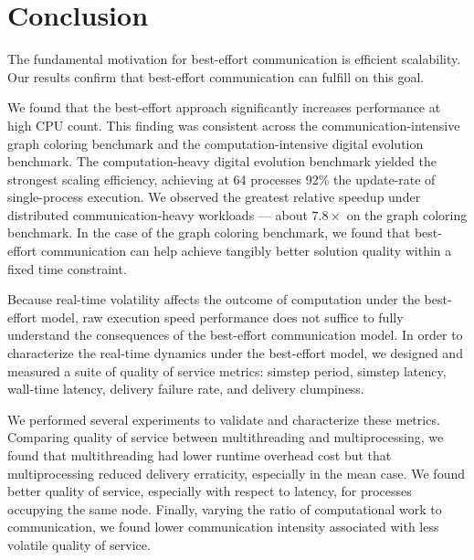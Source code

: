 \section{Conclusion}

The fundamental motivation for best-effort communication is efficient scalability.
Our results confirm that best-effort communication can fulfill on this goal.

We found that the best-effort approach significantly increases performance at high CPU count.
This finding was consistent across the communication-intensive graph coloring benchmark and the computation-intensive digital evolution benchmark.
The computation-heavy digital evolution benchmark yielded the strongest scaling efficiency, achieving at 64 processes 92\% the update-rate of single-process execution.
We observed the greatest relative speedup under distributed communication-heavy workloads --- about $7.8\times$ on the graph coloring benchmark.
In the case of the graph coloring benchmark, we found that best-effort communication can help achieve tangibly better solution quality within a fixed time constraint.

Because real-time volatility affects the outcome of computation under the best-effort model, raw execution speed performance does not suffice to fully understand the consequences of the best-effort communication model.
In order to characterize the real-time dynamics under the best-effort model, we designed and measured a suite of quality of service metrics: simstep period, simstep latency, wall-time latency, delivery failure rate, and delivery clumpiness.

We performed several experiments to validate and characterize these metrics.
Comparing quality of service between multithreading and multiprocessing, we found that multithreading had lower runtime overhead cost but that multiprocessing reduced delivery erraticity, especially in the mean case.
We found better quality of service, especially with respect to latency, for processes occupying the same node.
Finally, varying the ratio of computational work to communication, we found lower communication intensity associated with less volatile quality of service.

